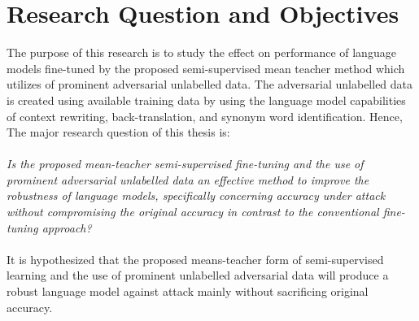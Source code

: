 \documentclass[%
	BCOR=8mm, %
	DIV=12,
	toc=bibliography, %
	toc=listof, %
	oneside, %
	egregdoesnotlikesansseriftitles, %
	]{scrbook}
\begin{document}
\section{Research Question and Objectives}
\label{section:researchquestions}
The purpose of this research is to study the effect on performance of language models fine-tuned by the proposed semi-supervised mean teacher method which utilizes of prominent adversarial unlabelled data. The adversarial unlabelled data is created using available training data by using the language model capabilities of context rewriting, back-translation, and synonym word identification. Hence, The major research question of this thesis is: \\\\
 \emph{Is the proposed mean-teacher semi-supervised fine-tuning and the use of prominent adversarial unlabelled data an effective method to improve the robustness of language models, specifically concerning accuracy under attack without compromising the original accuracy in contrast to the conventional fine-tuning approach?}\\\\
It is hypothesized that the proposed means-teacher form of semi-supervised learning and the use of prominent unlabelled adversarial data will produce a robust language model against attack mainly without sacrificing original accuracy. \\
\end{document}
